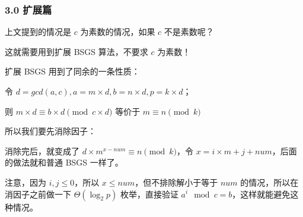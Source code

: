 \subsubsection{3.0 扩展篇}

上文提到的情况是 $c$ 为素数的情况，如果 $c$ 不是素数呢？

这就需要用到扩展 BSGS 算法，不要求 $c$ 为素数！

扩展 BSGS 用到了同余的一条性质：

令 $d=gcd(a,c) ,a=m \times d,b=n \times d,p=k \times d$；

则 $m \times d \equiv b \times d \pmod {c \times d}$ 等价于 $m \equiv n \pmod k$

所以我们要先消除因子：


消除完后，就变成了 $d \times m^{x-num} \equiv n \pmod k$，令 $x=i \times m+j+num$，后面的做法就和普通 BSGS 一样了。

注意，因为 $i,j \le 0$，所以 $x \le num$，但不排除解小于等于 $num$ 的情况，所以在消因子之前做一下 $\Theta(\log_2 p)$ 枚举，直接验证 $a^i \mod c = b$，这样就能避免这种情况。
